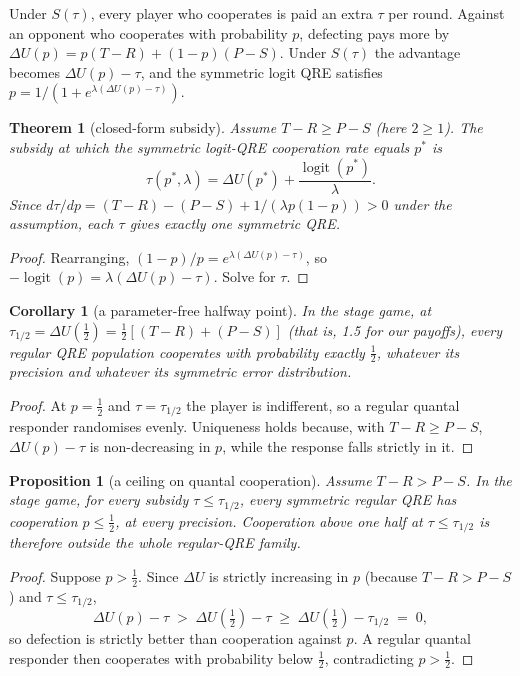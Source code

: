 \documentclass[11pt]{article}
\newtheorem{theorem}{Theorem}
\newtheorem{proposition}{Proposition}
\newtheorem{corollary}{Corollary}
\theoremstyle{definition}
\theoremstyle{remark}
\newcommand{\lam}{\lambda}
\DeclareMathOperator{\logit}{logit}
\begin{document}
Under $S(\tau)$, every player who cooperates is paid an extra $\tau$ per round. Against an
opponent who cooperates with probability $p$, defecting pays more by
$\Delta U(p)=p(T-R)+(1-p)(P-S)$. Under $S(\tau)$ the advantage becomes $\Delta U(p)-\tau$, and the
symmetric logit QRE satisfies $p = 1/(1+e^{\lam(\Delta U(p)-\tau)})$.

\begin{theorem}[closed-form subsidy]\label{thm:subsidy}
Assume $T-R\ge P-S$ (here $2\ge1$). The subsidy at which the symmetric logit-QRE cooperation
rate equals $p^*$ is
\[
\tau(p^*,\lam)=\Delta U(p^*)+\frac{\logit(p^*)}{\lam}.
\]
Since $d\tau/dp=(T-R)-(P-S)+1/(\lam p(1-p))>0$ under the assumption, each $\tau$ gives exactly one
symmetric QRE.
\end{theorem}
\begin{proof}
Rearranging, $(1-p)/p=e^{\lam(\Delta U(p)-\tau)}$, so $-\logit(p)=\lam(\Delta U(p)-\tau)$. Solve
for $\tau$.
\end{proof}

\begin{corollary}[a parameter-free halfway point]\label{cor:half}
In the stage game, at $\tau_{1/2}=\Delta U(\tfrac12)=\tfrac12[(T-R)+(P-S)]$ (that is, 1.5 for our
payoffs), every regular QRE population cooperates with probability exactly $\tfrac12$, whatever
its precision and whatever its symmetric error distribution.
\end{corollary}
\begin{proof}
At $p=\tfrac12$ and $\tau=\tau_{1/2}$ the player is indifferent, so a regular quantal responder
randomises evenly. Uniqueness holds because, with $T-R\ge P-S$, $\Delta U(p)-\tau$ is
non-decreasing in $p$, while the response falls strictly in it.
\end{proof}

\begin{proposition}[a ceiling on quantal cooperation]\label{prop:ceiling}
Assume $T-R>P-S$. In the stage game, for every subsidy $\tau\le\tau_{1/2}$, every symmetric
regular QRE has
cooperation $p\le\tfrac12$, at every precision. Cooperation above one half at
$\tau\le\tau_{1/2}$ is therefore outside the whole regular-QRE family.
\end{proposition}
\begin{proof}
Suppose $p>\tfrac12$. Since $\Delta U$ is strictly increasing in $p$ (because $T-R>P-S$) and
$\tau\le\tau_{1/2}$,
\[
\Delta U(p)-\tau\;>\;\Delta U(\tfrac12)-\tau\;\ge\;\Delta U(\tfrac12)-\tau_{1/2}\;=\;0,
\]
so defection is strictly better than cooperation against $p$. A regular quantal responder then cooperates with probability below
$\tfrac12$, contradicting $p>\tfrac12$.
\end{proof}
\end{document}
